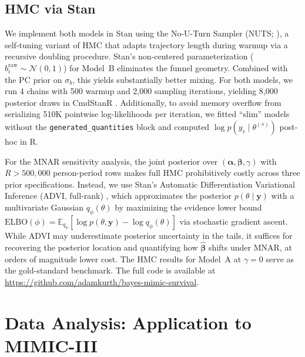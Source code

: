 \documentclass[twoside,11pt]{article}
\begin{document}
\subsection{HMC via Stan}\label{sc:stan}
We implement both models in Stan using the No-U-Turn Sampler (NUTS; \citealp{hoffman-gelman-nuts}), a self-tuning variant of HMC that adapts trajectory length during warmup via a recursive doubling procedure. Stan's non-centered parameterization ($b_i^{\text{raw}} \sim \mathcal{N}(0, 1)$) for Model~B eliminates the funnel geometry. Combined with the PC prior on $\sigma_b$, this yields substantially better mixing. For both models, we run 4 chains with 500 warmup and 2,000 sampling iterations, yielding 8,000 posterior draws in CmdStanR \citep{cmdstan}. Additionally, to avoid memory overflow from serializing 510K pointwise log-likelihoods per iteration, we fitted ``slim'' models without the \texttt{generated\_quantities} block and computed $\log p(y_r \mid \theta^{(s)})$ post-hoc in R.
 
For the MNAR sensitivity analysis, the joint posterior over $(\boldsymbol{\alpha}, \boldsymbol{\beta}, \gamma)$ with $R > 500,000$ person-period rows makes full HMC prohibitively costly across three prior specifications. Instead, we use Stan's Automatic Differentiation Variational Inference (ADVI, full-rank) \citep{cmdstan}, which approximates the posterior $p(\theta \mid \mathbf{y})$ with a multivariate Gaussian $q_\phi(\theta)$ by maximizing the evidence lower bound $\text{ELBO}(\phi) = \mathbb{E}_{q_\phi}[\log p(\theta, \mathbf{y}) - \log q_\phi(\theta)]$ via stochastic gradient ascent. While ADVI may underestimate posterior uncertainty in the tails, it suffices for recovering the posterior location and quantifying how $\hat{\boldsymbol{\beta}}$ shifts under MNAR, at orders of magnitude lower cost. The HMC results for Model~A at $\gamma = 0$ serve as the gold-standard benchmark. The full code is available at \url{https://github.com/adamkurth/bayes-mimic-survival}.
 

\section{Data Analysis: Application to MIMIC-III} \label{sc:application}
 
\end{document}

